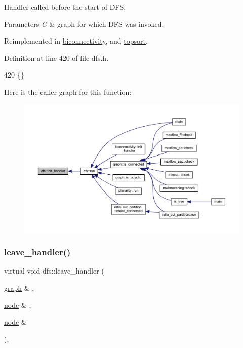 Handler called before the start of D\+FS. 


\begin{DoxyParams}{Parameters}
{\em G} & graph for which D\+FS was invoked. \\
\hline
\end{DoxyParams}


Reimplemented in \mbox{\hyperlink{classbiconnectivity_a64adab869e0080e3a1f8479e70010317}{biconnectivity}}, and \mbox{\hyperlink{classtopsort_a21aaf28fc280094ed43288e58d8e3ae1}{topsort}}.



Definition at line 420 of file dfs.\+h.


\begin{DoxyCode}
420 \{\}
\end{DoxyCode}
Here is the caller graph for this function\+:
\nopagebreak
\begin{figure}[H]
\begin{center}
\leavevmode
\includegraphics[width=350pt]{classdfs_aae46a50d0c73c63bf72e483668fd22a2_icgraph}
\end{center}
\end{figure}
\mbox{\label{classdfs_abfe33292cd567f22596ba0c313481582}} 
\subsubsection{\texorpdfstring{leave\+\_\+handler()}{leave\_handler()}}
{\footnotesize\ttfamily virtual void dfs\+::leave\+\_\+handler (\begin{DoxyParamCaption}\item[{\mbox{\hyperlink{classgraph}{graph}} \&}]{,  }\item[{\mbox{\hyperlink{classnode}{node}} \&}]{,  }\item[{\mbox{\hyperlink{classnode}{node}} \&}]{ }\end{DoxyParamCaption})\hspace{0.3cm}{\ttfamily [inline]}, {\ttfamily [virtual]}}



